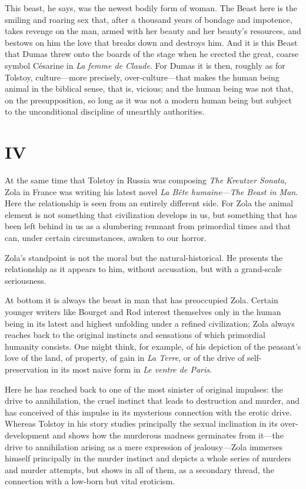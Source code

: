 \documentclass[12pt,a4paper]{article}
\begin{document}
This beast, he says, was the newest bodily form of woman. The Beast
here is the smiling and roaring sex that, after a thousand years of
bondage and impotence, takes revenge on the man, armed with her beauty
and her beauty's resources, and bestows on him the love that breaks
down and destroys him. And it is this Beast that Dumas threw onto the
boards of the stage when he erected the great, coarse symbol Césarine
in \textit{La femme de Claude}. For Dumas it is then, roughly as for
Tolstoy, culture---more precisely, over-culture---that makes the human
being animal in the biblical sense, that is, vicious; and the human
being was not that, on the presupposition, so long as it was not a
modern human being but subject to the unconditional discipline of
unearthly authorities.

\section*{IV}

At the same time that Tolstoy in Russia was composing \textit{The
Kreutzer Sonata}, Zola in France was writing his latest novel
\textit{La Bête humaine}---\textit{The Beast in Man}. Here the
relationship is seen from an entirely different side. For Zola the
animal element is not something that civilization develops in us, but
something that has been left behind in us as a slumbering remnant from
primordial times and that can, under certain circumstances, awaken to
our horror.

Zola's standpoint is not the moral but the natural-historical. He
presents the relationship as it appears to him, without accusation,
but with a grand-scale seriousness.

At bottom it is always the beast in man that has preoccupied Zola.
Certain younger writers like Bourget and Rod interest themselves only
in the human being in its latest and highest unfolding under a refined
civilization; Zola always reaches back to the original instincts and
sensations of which primordial humanity consists. One might think, for
example, of his depiction of the peasant's love of the land, of
property, of gain in \textit{La Terre}, or of the drive of
self-preservation in its most naive form in \textit{Le ventre de
Paris}.

Here he has reached back to one of the most sinister of original
impulses: the drive to annihilation, the cruel instinct that leads to
destruction and murder, and has conceived of this impulse in its
mysterious connection with the erotic drive. Whereas Tolstoy in his
story studies principally the sexual inclination in its over-development
and shows how the murderous madness germinates from it---the drive to
annihilation arising as a mere expression of jealousy---Zola immerses
himself principally in the murder instinct and depicts a whole series
of murders and murder attempts, but shows in all of them, as a
secondary thread, the connection with a low-born but vital eroticism.
\end{document}
